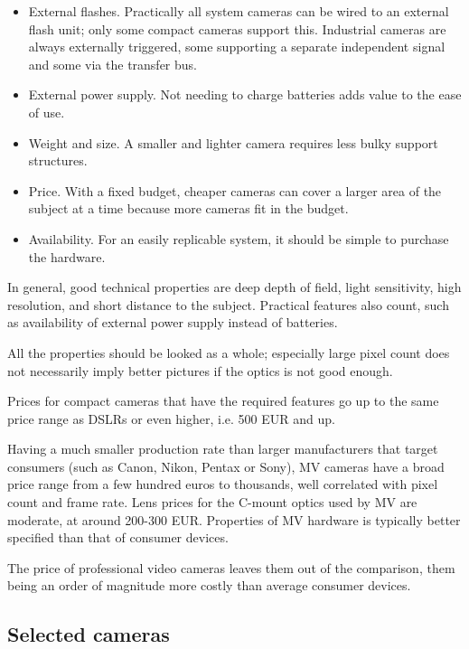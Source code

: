 \begin{itemize}
	\item External flashes. Practically all system cameras can be wired to an external flash unit; only some compact cameras support this. Industrial cameras are always externally triggered, some supporting a separate independent signal and some via the transfer bus.

	\item External power supply. Not needing to charge batteries adds value to the ease of use.

	\item Weight and size. A smaller and lighter camera requires less bulky support structures.

	\item Price. With a fixed budget, cheaper cameras can cover a larger area of the subject at a time because more cameras fit in the budget.

	\item Availability. For an easily replicable system, it should be simple to purchase the hardware.
\end{itemize}

In general, good technical properties are deep depth of field, light sensitivity, high resolution, and short distance to the subject.
Practical features also count, such as availability of external power supply instead of batteries.

All the properties should be looked as a whole; especially large pixel count does not necessarily imply better pictures if the optics is not good enough.

Prices for compact cameras that have the required features go up to the same price range as DSLRs or even higher, i.e. 500 EUR and up.

Having a much smaller production rate than larger manufacturers that target consumers (such as Canon, Nikon, Pentax or Sony), MV cameras have a broad price range from a few hundred euros to thousands, well correlated with pixel count and frame rate.
Lens prices for the C-mount optics used by MV are moderate, at around 200-300 EUR.
Properties of MV hardware is typically better specified than that of consumer devices.

The price of professional video cameras leaves them out of the comparison, them being an order of magnitude more costly than average consumer devices.


\subsection{Selected cameras} %

